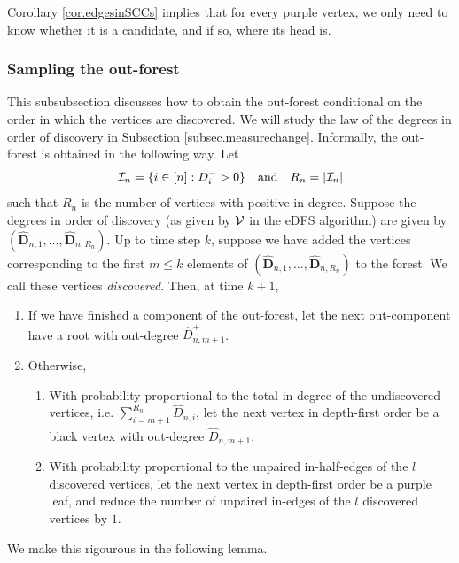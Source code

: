 Corollary \ref{cor.edgesinSCCs} implies that for every purple vertex, we only need to know whether it is a candidate, and if so, where its head is. 
\subsubsection{Sampling the out-forest}\label{subsubsec.samplingoutforest}
This subsubsection discusses how to obtain the out-forest conditional on the order in which the vertices are discovered. We will study the law of the degrees in order of discovery in Subsection \ref{subsec.measurechange}. Informally, the out-forest is obtained in the following way. Let
\begin{equation*}
    {\mathcal I}_n = \{i \in [n]: D_i^- > 0\}
    \quad \text{and} \quad
    R_n = \lvert{\mathcal I}_n\rvert
\end{equation*}
such that $R_n$ is the number of vertices with positive in-degree. Suppose the degrees in order of discovery (as given by $\mathcal V$ in the eDFS algorithm) are given by $(\mathbf{\hat{D}}_{n,1},\dots,\mathbf{\hat{D}}_{n, R_n})$. Up to time step $k$, suppose we have added the vertices corresponding to the first $m\leq k$ elements of  $(\mathbf{\hat{D}}_{n,1},\dots,\mathbf{\hat{D}}_{n, R_n})$ to the forest. We call these vertices \emph{discovered}. Then, at time $k+1$,
\begin{enumerate}
    \item If we have finished a component of the out-forest, let the next out-component have a root with out-degree $\hat{D}_{n,m+1}^+$. 
    \item Otherwise,
    \begin{enumerate}\item With probability proportional to the total in-degree of the undiscovered vertices, i.e. $\sum_{i={m+1}}^{R_n} \hat{D}_{n,i}^-$, let the next vertex in depth-first order be a black vertex with out-degree $\hat{D}_{n,m+1}^+$. 
    \item With probability proportional to the unpaired in-half-edges of the $l$ discovered vertices, let the next vertex in depth-first order be a purple leaf, and reduce the number of unpaired in-edges of the $l$ discovered vertices by $1$.
\end{enumerate}
\end{enumerate}
We make this rigourous in the following lemma.
